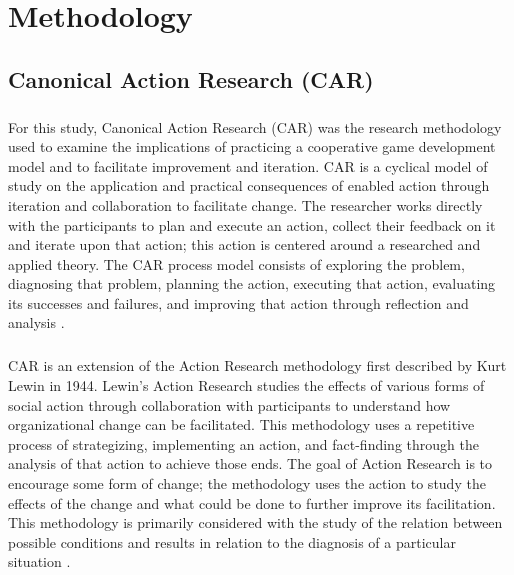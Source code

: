 \chapter{Methodology}

\section{Canonical Action Research (CAR)}


\paragraph{} For this study, Canonical Action Research (CAR) was the research methodology used to examine the implications of practicing a cooperative game development model and to facilitate improvement and iteration. CAR is a cyclical model of study on the application and practical consequences of enabled action through iteration and collaboration to facilitate change. The researcher works directly with the participants to plan and execute an action, collect their feedback on it and iterate upon that action; this action is centered around a researched and applied theory. The CAR process model consists of exploring the problem, diagnosing that problem, planning the action, executing that action, evaluating its successes and failures, and improving that action through reflection and analysis \autocite{davison_principles_2004}.

\paragraph{} CAR is an extension of the Action Research methodology first described by Kurt Lewin in 1944. Lewin's Action Research studies the effects of various forms of social action through collaboration with participants to understand how organizational change can be facilitated. This methodology uses a repetitive process of strategizing, implementing an action, and fact-finding through the analysis of that action to achieve those ends. The goal of Action Research is to encourage some form of change; the methodology uses the action to study the effects of the change and what could be done to further improve its facilitation. This methodology is primarily considered with the study of the relation between possible conditions and results in relation to the diagnosis of a particular situation \autocite{lewin_action_1946}.

